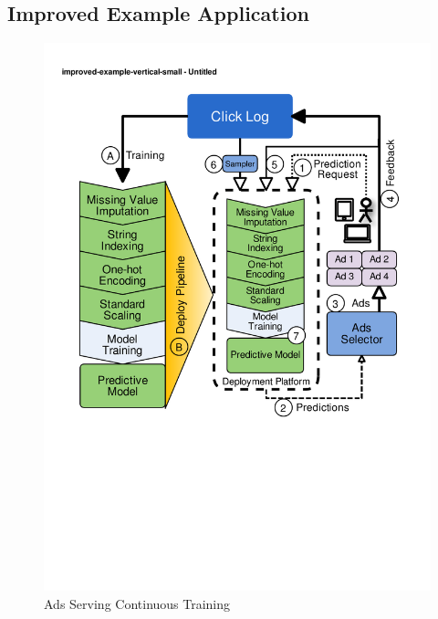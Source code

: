 \subsection{Improved Example Application}
\begin{figure}[t]
\centering
\includegraphics[width=\columnwidth]{../images/improved-example.pdf}
\caption{Ads Serving Continuous Training}
\label{fig:improved-example}
\end{figure}

